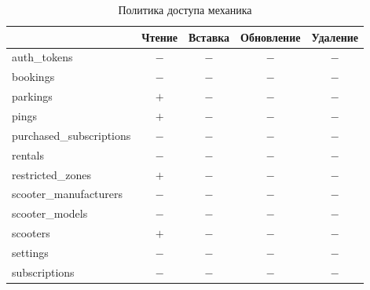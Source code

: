 \begin{table}[H]
	\begin{threeparttable}[b]
		\caption{Политика доступа механика}
		\label{tbl:technician-policy}
		{\renewcommand{\arraystretch}{1.2}
			\begin{tabularx}{\textwidth}
				{
					| >{\raggedright\arraybackslash}X
					| >{\centering\arraybackslash}c
					| >{\centering\arraybackslash}c
					| >{\centering\arraybackslash}c
					| >{\centering\arraybackslash}c |
				}
				\hline
				                         & \textbf{Чтение}     & \textbf{Вставка} & \textbf{Обновление} & \textbf{Удаление} \\
				\hline
				auth\_tokens             & $-$                 & $-$              & $-$                 & $-$               \\
				\hline
				bookings                 & $-$                 & $-$              & $-$                 & $-$               \\
				\hline
				parkings                 & $+$                 & $-$              & $-$                 & $-$               \\
				\hline
				pings                    & $+$\rlap{\tnote{1}} & $-$              & $-$                 & $-$               \\
				\hline
				purchased\_subscriptions & $-$                 & $-$              & $-$                 & $-$               \\
				\hline
				rentals                  & $-$                 & $-$              & $-$                 & $-$               \\
				\hline
				restricted\_zones        & $+$                 & $-$              & $-$                 & $-$               \\
				\hline
				scooter\_manufacturers   & $-$                 & $-$              & $-$                 & $-$               \\
				\hline
				scooter\_models          & $-$                 & $-$              & $-$                 & $-$               \\
				\hline
				scooters                 & $+$                 & $-$              & $-$                 & $-$               \\
				\hline
				settings                 & $-$                 & $-$              & $-$                 & $-$               \\
				\hline
				subscriptions            & $-$                 & $-$              & $-$                 & $-$               \\

\end{tabularx}}
\end{threeparttable}
\end{table}
